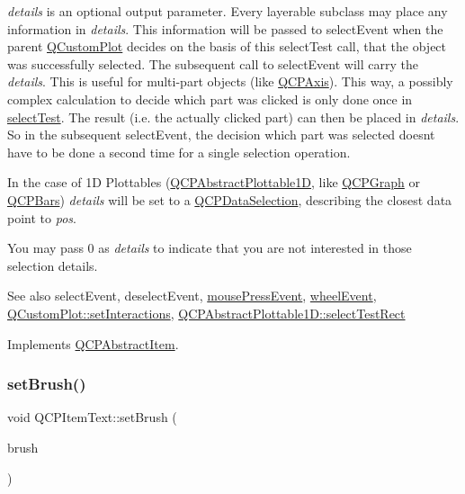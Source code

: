{\itshape details} is an optional output parameter. Every layerable subclass may place any information in {\itshape details}. This information will be passed to select\+Event when the parent \hyperlink{classQCustomPlot}{Q\+Custom\+Plot} decides on the basis of this select\+Test call, that the object was successfully selected. The subsequent call to select\+Event will carry the {\itshape details}. This is useful for multi-\/part objects (like \hyperlink{classQCPAxis}{Q\+C\+P\+Axis}). This way, a possibly complex calculation to decide which part was clicked is only done once in \hyperlink{classQCPItemText_a676aaec10ad3cc4d7d0e4847db04c838}{select\+Test}. The result (i.\+e. the actually clicked part) can then be placed in {\itshape details}. So in the subsequent select\+Event, the decision which part was selected doesn\textquotesingle{}t have to be done a second time for a single selection operation.

In the case of 1D Plottables (\hyperlink{classQCPAbstractPlottable1D}{Q\+C\+P\+Abstract\+Plottable1D}, like \hyperlink{classQCPGraph}{Q\+C\+P\+Graph} or \hyperlink{classQCPBars}{Q\+C\+P\+Bars}) {\itshape details} will be set to a \hyperlink{classQCPDataSelection}{Q\+C\+P\+Data\+Selection}, describing the closest data point to {\itshape pos}.

You may pass 0 as {\itshape details} to indicate that you are not interested in those selection details.

\begin{DoxySeeAlso}{See also}
select\+Event, deselect\+Event, \hyperlink{classQCPLayerable_af6567604818db90f4fd52822f8bc8376}{mouse\+Press\+Event}, \hyperlink{classQCPLayerable_a47dfd7b8fd99c08ca54e09c362b6f022}{wheel\+Event}, \hyperlink{classQCustomPlot_a5ee1e2f6ae27419deca53e75907c27e5}{Q\+Custom\+Plot\+::set\+Interactions}, \hyperlink{classQCPAbstractPlottable1D_a22377bf6e57ab7eedbc9e489250c6ded}{Q\+C\+P\+Abstract\+Plottable1\+D\+::select\+Test\+Rect} 
\end{DoxySeeAlso}


Implements \hyperlink{classQCPAbstractItem_ae41d0349d68bb802c49104afd100ba2a}{Q\+C\+P\+Abstract\+Item}.

\mbox{\label{classQCPItemText_a1c7e131516df2ed8d941ef31240ded8e}} 
\subsubsection{\texorpdfstring{set\+Brush()}{setBrush()}}
{\footnotesize\ttfamily void Q\+C\+P\+Item\+Text\+::set\+Brush (\begin{DoxyParamCaption}\item[{const Q\+Brush \&}]{brush }\end{DoxyParamCaption})}

